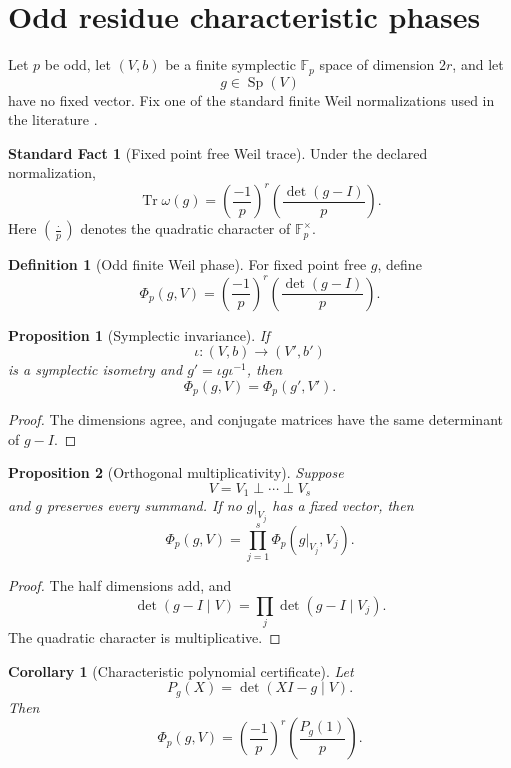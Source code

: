 \documentclass[11pt]{amsart}
\newtheorem{proposition}[proposition]{Proposition}
\newtheorem{corollary}[corollary]{Corollary}
\theoremstyle{definition}
\newtheorem{definition}[definition]{Definition}
\newtheorem{standardfact}[standardfact]{Standard Fact}
\theoremstyle{remark}
\newcommand{\FF}{\mathbb F}
\newcommand{\Sp}{\operatorname{Sp}}
\newcommand{\Tr}{\operatorname{Tr}}
\newcommand{\perpbig}{\mathop{\perp}\limits}
\begin{document}
\section{Odd residue characteristic phases}\label{sec:oddphase}

Let \(p\) be odd, let \((V,b)\) be a finite symplectic \(\FF_p\) space of dimension \(2r\), and let
\[
g\in\Sp(V)
\]
have no fixed vector. Fix one of the standard finite Weil normalizations used in the literature \cite{Gerardin1977,Neuhauser2002,GurevichHadani2007}.

\begin{standardfact}[Fixed point free Weil trace]\label{fact:weil_trace}
Under the declared normalization,
\[
\boxed{
\Tr\omega(g)
=
\left(\frac{-1}{p}\right)^r
\left(\frac{\det(g-I)}{p}\right).
}
\]
Here \((\frac{\cdot}{p})\) denotes the quadratic character of \(\FF_p^{\times}\).
\end{standardfact}

\begin{definition}[Odd finite Weil phase]\label{def:odd_phase}
For fixed point free \(g\), define
\[
\Phi_p(g,V)
=
\left(\frac{-1}{p}\right)^r
\left(\frac{\det(g-I)}{p}\right).
\]
\end{definition}

\begin{proposition}[Symplectic invariance]\label{prop:phase_invariance}
If
\[
\iota:(V,b)\longrightarrow(V',b')
\]
is a symplectic isometry and \(g'=\iota g\iota^{-1}\), then
\[
\Phi_p(g,V)=\Phi_p(g',V').
\]
\end{proposition}

\begin{proof}
The dimensions agree, and conjugate matrices have the same determinant of \(g-I\).
\end{proof}

\begin{proposition}[Orthogonal multiplicativity]\label{prop:odd_multiplicativity}
Suppose
\[
V=V_1\perpbig\cdots\perpbig V_s
\]
and \(g\) preserves every summand. If no \(g|_{V_j}\) has a fixed vector, then
\[
\boxed{
\Phi_p(g,V)
=
\prod_{j=1}^{s}
\Phi_p(g|_{V_j},V_j).
}
\]
\end{proposition}

\begin{proof}
The half dimensions add, and
\[
\det(g-I\mid V)
=
\prod_j\det(g-I\mid V_j).
\]
The quadratic character is multiplicative.
\end{proof}

\begin{corollary}[Characteristic polynomial certificate]\label{cor:characteristic_phase}
Let
\[
P_g(X)=\det(XI-g\mid V).
\]
Then
\[
\boxed{
\Phi_p(g,V)
=
\left(\frac{-1}{p}\right)^r
\left(\frac{P_g(1)}{p}\right).
}
\]
\end{corollary}
\end{document}

